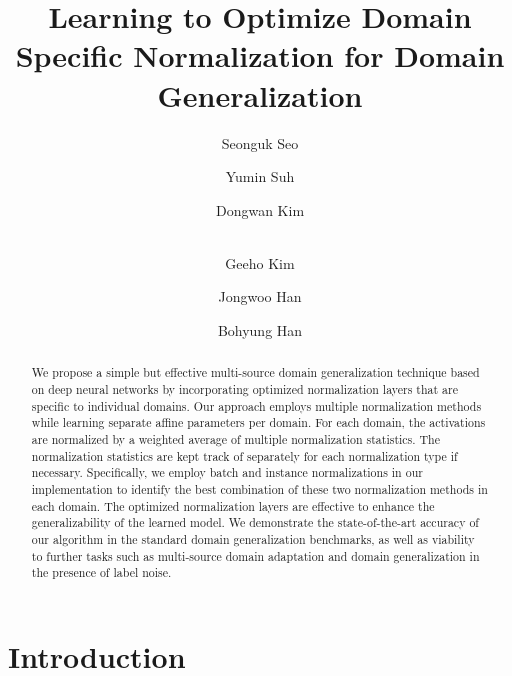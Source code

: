 \documentclass[runningheads]{llncs}
\begin{document}
\pagestyle{headings}
\mainmatter
\def\ECCVSubNumber{3935}  

\title{Learning to Optimize Domain Specific Normalization for Domain Generalization} 

\begin{comment}
\titlerunning{ECCV-20 submission ID \ECCVSubNumber} 
\authorrunning{ECCV-20 submission ID \ECCVSubNumber} 
\author{Anonymous ECCV submission}
\institute{Paper ID \ECCVSubNumber}
\end{comment}


\author{Seonguk Seo \and
Yumin Suh \and
Dongwan Kim \and \\
Geeho Kim \and
Jongwoo Han \and
Bohyung Han
}
\maketitle

\begin{abstract}
We propose a simple but effective multi-source domain generalization technique based on deep neural networks by incorporating optimized normalization layers that are specific to individual domains.
Our approach employs multiple normalization methods while learning separate affine parameters per domain.
For each domain, the activations are normalized by a weighted average of multiple normalization statistics.
The normalization statistics are kept track of separately for each normalization type if necessary.
Specifically, we employ batch and instance normalizations in our implementation to identify the best combination of these two normalization methods in each domain.
The optimized normalization layers are effective to enhance the generalizability of the learned model.
We demonstrate the state-of-the-art accuracy of our algorithm in the standard domain generalization benchmarks, as well as viability to further tasks such as multi-source domain adaptation and domain generalization in the presence of label noise.
\end{abstract}



\section{Introduction}
\end{document}

